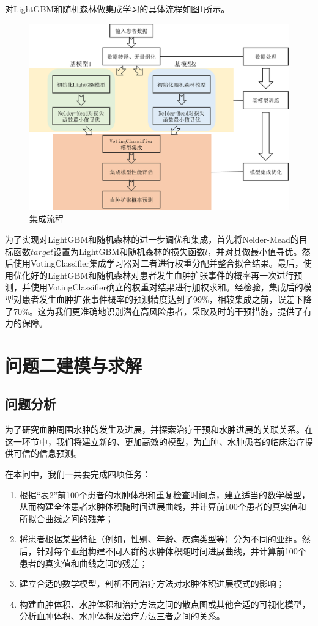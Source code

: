 \documentclass[bwprint]{gmcmthesis}
\begin{document}
对LightGBM和随机森林做集成学习的具体流程如图\ref{fig:集成流程图}所示。
\begin{figure}[h]
    \centering
    \includegraphics[width = \linewidth]{figures/集成原理.png}
    \caption{集成流程}
    \label{fig:集成流程图}
\end{figure}

为了实现对LightGBM和随机森林的进一步调优和集成，首先将Nelder-Mead的目标函数$target$设置为LightGBM和随机森林的损失函数$l$，并对其做最小值寻优。然后使用VotingClassifier集成学习器对二者进行权重分配并整合拟合结果。最后，使用优化好的LightGBM和随机森林对患者发生血肿扩张事件的概率再一次进行预测，并使用VotingClassifier确立的权重对结果进行加权求和。经检验，集成后的模型对患者发生血肿扩张事件概率的预测精度达到了99\%，相较集成之前，误差下降了70\%。这为我们更准确地识别潜在高风险患者，采取及时的干预措施，提供了有力的保障。


\section{问题二建模与求解}
\subsection{问题分析}
为了研究血肿周围水肿的发生及进展，并探索治疗干预和水肿进展的关联关系。在这一环节中，我们将建立新的、更加高效的模型，为血肿、水肿患者的临床治疗提供可信的信息预测。

在本问中，我们一共要完成四项任务：
\begin{enumerate}
    \item 根据“表2”前100个患者的水肿体积和重复检查时间点，建立适当的数学模型，从而构建全体患者水肿体积随时间进展曲线，并计算前100个患者的真实值和所拟合曲线之间的残差；
    \item 将患者根据某些特征（例如，性别、年龄、疾病类型等）分为不同的亚组。然后，针对每个亚组构建不同人群的水肿体积随时间进展曲线，并计算前100个患者的真实值和曲线之间的残差；
    \item 建立合适的数学模型，剖析不同治疗方法对水肿体积进展模式的影响；
    \item 构建血肿体积、水肿体积和治疗方法之间的散点图或其他合适的可视化模型，分析血肿体积、水肿体积及治疗方法三者之间的关系。
\end{enumerate}
    
\end{document}

